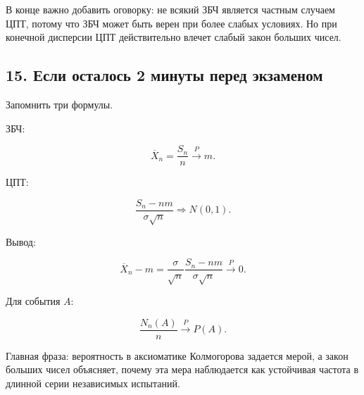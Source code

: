 \documentclass[
  11pt,
  a4paper,
]{article}
\begin{document}
В конце важно добавить оговорку: не всякий ЗБЧ является частным случаем
ЦПТ, потому что ЗБЧ может быть верен при более слабых условиях. Но при
конечной дисперсии ЦПТ действительно влечет слабый закон больших чисел.

\subsection{15. Если осталось 2 минуты перед
экзаменом}\label{ux435ux441ux43bux438-ux43eux441ux442ux430ux43bux43eux441ux44c-2-ux43cux438ux43dux443ux442ux44b-ux43fux435ux440ux435ux434-ux44dux43aux437ux430ux43cux435ux43dux43eux43c}

Запомнить три формулы.

ЗБЧ:

\[
\overline X_n=\frac{S_n}{n}\xrightarrow{P}m.
\]

ЦПТ:

\[
\frac{S_n-nm}{\sigma\sqrt n}
\Rightarrow
N(0,1).
\]

Вывод:

\[
\overline X_n-m
=
\frac{\sigma}{\sqrt n}
\frac{S_n-nm}{\sigma\sqrt n}
\xrightarrow{P}0.
\]

Для события \(A\):

\[
\frac{N_n(A)}{n}\xrightarrow{P}P(A).
\]

Главная фраза: вероятность в аксиоматике Колмогорова задается мерой, а
закон больших чисел объясняет, почему эта мера наблюдается как
устойчивая частота в длинной серии независимых испытаний.

\newpage
\end{document}
